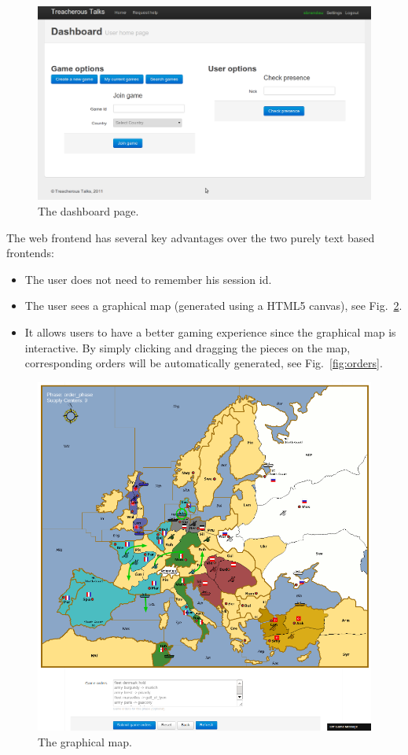 \documentclass[11pt,a4paper]{report}
\begin{document}
\begin{figure}[h]
 \centering
 \includegraphics[width=\textwidth]{./graphics/overviewpage.png}
 \caption{The dashboard page.}
 \label{fig:dashboard}
\end{figure}

The web frontend has several key advantages over the two purely text based
frontends:
\begin{itemize}
\item The user does not need to remember his session id.
\item The user sees a graphical map (generated using a HTML5 canvas),
  see Fig.~\ref{fig:map}.
\item It allows users to have a better gaming experience since the graphical map
is interactive. By simply clicking and dragging the pieces on the map,
corresponding orders will be automatically generated, see Fig.~\ref{fig:orders}.
\end{itemize}

\begin{figure}[h]
 \centering
 \includegraphics[width=\textwidth]{./graphics/graphicalmap.png}
 \caption{The graphical map.}
 \label{fig:map}
\end{figure}
\end{document}
